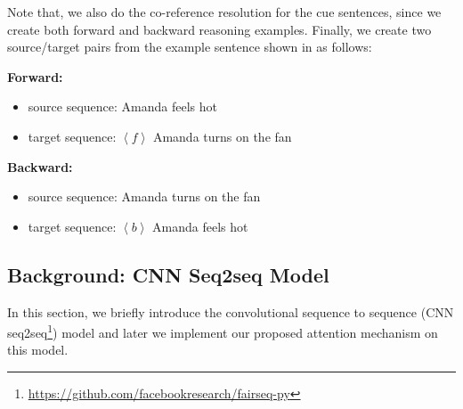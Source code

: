 Note that, we also do the co-reference resolution for the cue sentences, since we create both forward and backward reasoning examples. 
Finally, we create two source/target pairs from the example sentence shown in  as follows:

\textbf{Forward:}
 \begin{itemize}
	\item [] source sequence: Amanda feels hot
	\item [] target sequence: $\left< f\right>$ Amanda turns on the fan
\end{itemize}

\textbf{Backward:}
\begin{itemize}
	\item [] source sequence: Amanda turns on the fan
	\item [] target sequence: $\left< b\right>$ Amanda feels hot
\end{itemize}

\subsection{Background: CNN Seq2seq Model}
\label{sec:cnn}
In this section, we briefly introduce the convolutional sequence to sequence (CNN seq2seq\footnote{\url{https://github.com/facebookresearch/fairseq-py}}) model and later we implement our proposed attention mechanism on this model.

%

